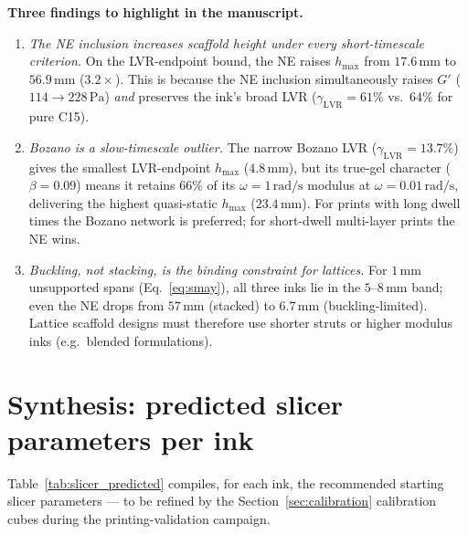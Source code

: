 \documentclass[11pt,a4paper]{article}
\newcommand{\Pa}{\,\mathrm{Pa}}
\begin{document}
\noindent\textbf{Three findings to highlight in the manuscript.}
\begin{enumerate}[leftmargin=1.6em]
\item \emph{The NE inclusion increases scaffold height under every short-timescale
criterion.} On the LVR-endpoint bound, the NE raises $h_\mathrm{max}$ from
$17.6\,\mathrm{mm}$ to $56.9\,\mathrm{mm}$ ($3.2\times$). This is because the NE
inclusion simultaneously raises $G'$ ($114\to 228\Pa$) \emph{and} preserves the
ink's broad LVR ($\gamma_\mathrm{LVR}=61\%$ vs.\ $64\%$ for pure C15).
\item \emph{Bozano is a slow-timescale outlier.} The narrow Bozano LVR
($\gamma_\mathrm{LVR}=13.7\%$) gives the smallest LVR-endpoint $h_\mathrm{max}$
($4.8\,\mathrm{mm}$), but its true-gel character ($\beta=0.09$) means it retains
$66\%$ of its $\omega=1\,\mathrm{rad/s}$ modulus at $\omega=0.01\,\mathrm{rad/s}$,
delivering the highest quasi-static $h_\mathrm{max}$ ($23.4\,\mathrm{mm}$). For
prints with long dwell times the Bozano network is preferred; for short-dwell
multi-layer prints the NE wins.
\item \emph{Buckling, not stacking, is the binding constraint for lattices.}
For $1\,\mathrm{mm}$ unsupported spans (Eq.~\ref{eq:smay}), all three inks lie in
the $5$--$8\,\mathrm{mm}$ band; even the NE drops from $57\,\mathrm{mm}$
(stacked) to $6.7\,\mathrm{mm}$ (buckling-limited). Lattice scaffold designs
must therefore use shorter struts or higher modulus inks (e.g.\ blended
formulations).
\end{enumerate}

\section{Synthesis: predicted slicer parameters per ink}
\label{sec:synthesis}

Table~\ref{tab:slicer_predicted} compiles, for each ink, the recommended starting
slicer parameters --- to be refined by the Section~\ref{sec:calibration}
calibration cubes during the printing-validation campaign.
\end{document}
